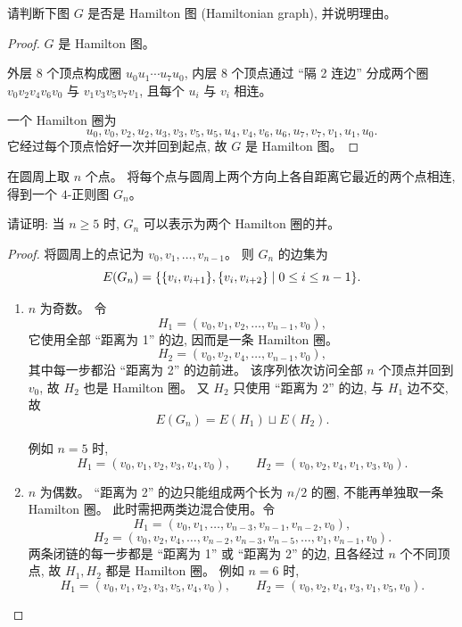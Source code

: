\documentclass[a4paper, justified]{tufte-handout}
\begin{document}
\begin{problem}
  请判断下图 $G$ 是否是 Hamilton 图 (Hamiltonian graph), 并说明理由。
\end{problem}

\begin{proof}
  $G$ 是 Hamilton 图。

  外层 8 个顶点构成圈 $u_0u_1\cdots u_7u_0$,
  内层 8 个顶点通过 ``隔 2 连边'' 分成两个圈
  $v_0v_2v_4v_6v_0$ 与 $v_1v_3v_5v_7v_1$,
  且每个 $u_i$ 与 $v_i$ 相连。

  一个 Hamilton 圈为
  \[
    u_0, v_0, v_2, u_2, u_3, v_3, v_5, u_5, u_4, v_4, v_6, u_6, u_7, v_7, v_1, u_1, u_0.
  \]
  它经过每个顶点恰好一次并回到起点, 故 $G$ 是 Hamilton 图。
\end{proof}

\begin{problem}
  在圆周上取 $n$ 个点。
  将每个点与圆周上两个方向上各自距离它最近的两个点相连,
  得到一个 $4$-正则图 $G_n$。

  \noindent 请证明: 当 $n \ge 5$ 时, $G_n$ 可以表示为两个 Hamilton 圈的并。
\end{problem}

\begin{proof}
  将圆周上的点记为 $v_0, v_1, \dots, v_{n-1}$。
  则 $G_n$ 的边集为
  \[
    E(G_n) = \{\{v_i, v_{i+1}\}, \{v_i, v_{i+2}\} \mid 0 \le i \le n-1\}.
  \]


  \begin{enumerate}[(1)]
    \item $n$ 为奇数。
      令
      \[
        H_1 = (v_0, v_1, v_2, \dots, v_{n-1}, v_0),
      \]
      它使用全部 ``距离为 1'' 的边, 因而是一条 Hamilton 圈。
      \[
        H_2 = (v_0, v_2, v_4, \dots, v_{n-1}, v_0),
      \]
      其中每一步都沿 ``距离为 2'' 的边前进。
      该序列依次访问全部 $n$ 个顶点并回到 $v_0$,
      故 $H_2$ 也是 Hamilton 圈。
      又 $H_2$ 只使用 ``距离为 2'' 的边, 与 $H_1$ 边不交, 故
      \[
        E(G_n) = E(H_1) \sqcup E(H_2).
      \]

      例如 $n = 5$ 时,
      \[
        H_1 = (v_0, v_1, v_2, v_3, v_4, v_0),
        \qquad
        H_2 = (v_0, v_2, v_4, v_1, v_3, v_0).
      \]

    \item $n$ 为偶数。
      ``距离为 2'' 的边只能组成两个长为 $n/2$ 的圈, 不能再单独取一条 Hamilton 圈。
      此时需把两类边混合使用。令
      \[
        H_1 = (v_0, v_1, \dots, v_{n-3}, v_{n-1}, v_{n-2}, v_0),
      \]
      \[
        H_2 = (v_0, v_2, v_4, \dots, v_{n-2}, v_{n-3}, v_{n-5}, \dots, v_1, v_{n-1}, v_0).
      \]
      两条闭链的每一步都是 ``距离为 1'' 或 ``距离为 2'' 的边,
      且各经过 $n$ 个不同顶点, 故 $H_1, H_2$ 都是 Hamilton 圈。
      例如 $n = 6$ 时,
      \[
        H_1 = (v_0, v_1, v_2, v_3, v_5, v_4, v_0),
        \qquad
        H_2 = (v_0, v_2, v_4, v_3, v_1, v_5, v_0).
      \]
  \end{enumerate}
\end{proof}
\end{document}
